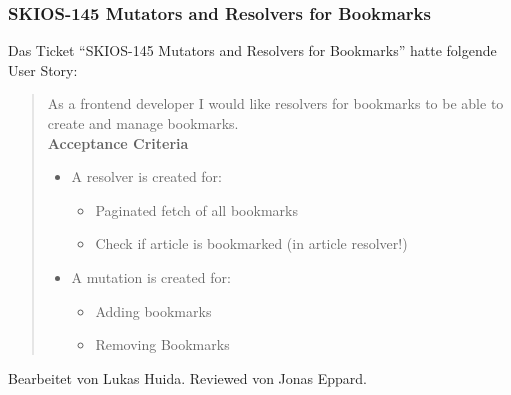 \subsubsection{SKIOS-145 Mutators and Resolvers for Bookmarks}
Das Ticket \enquote{SKIOS-145 Mutators and Resolvers for Bookmarks} hatte folgende User Story:
\begin{quotation}
    As a frontend developer I would like resolvers for bookmarks to be able to create and manage bookmarks. \\
\textbf{Acceptance Criteria}
\begin{itemize}
    \item A resolver is created for:
    \begin{itemize}
        \item Paginated fetch of all bookmarks
        \item Check if article is bookmarked (in article resolver!)
    \end{itemize}
    \item A mutation is created for:
    \begin{itemize}
        \item Adding bookmarks
        \item Removing Bookmarks
    \end{itemize}
\end{itemize}
\end{quotation}
Bearbeitet von Lukas Huida.
Reviewed von Jonas Eppard.
